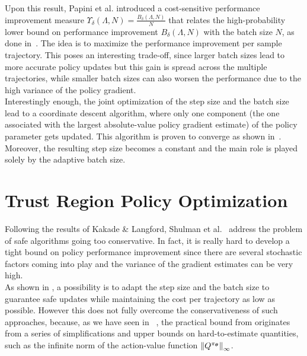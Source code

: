 Upon this result, Papini et al. introduced a cost-sensitive performance improvement measure $\Upsilon_\delta(\Lambda, N) = \frac{B_\delta(\Lambda, N)}{N}$ that relates the high-probability lower bound on performance improvement $B_\delta(\Lambda, N)$ with the batch size $N$, as done in~\cite{DBLP:journals/corr/abs-1712-03428}. The idea is to maximize the performance improvement per sample trajectory. This poses an interesting trade-off, since larger batch sizes lead to more accurate policy updates but this gain is spread across the multiple trajectories, while smaller batch sizes can also worsen the performance due to the high variance of the policy gradient.\\
Interestingly enough, the joint optimization of the step size and the batch size lead to a coordinate descent algorithm, where only one component (the one associated with the largest absolute-value policy gradient estimate) of the policy parameter gets updated. This algorithm is proven to converge as shown in~\cite{nutinicoordinate}. Moreover, the resulting step size becomes a constant and the main role is played solely by the adaptive batch size.

\section{Trust Region Policy Optimization}
\label{sec:trpo}
Following the results of Kakade \& Langford, Shulman et al.~\cite{trpo} address the problem of safe algorithms going too conservative. In fact, it is really hard to develop a tight bound on policy performance improvement since there are several stochastic factors coming into play and the variance of the gradient estimates can be very high.\\
As shown in , a possibility is to adapt the step size and the batch size to guarantee safe updates while maintaining the cost per trajectory as low as possible. However this does not fully overcome the conservativeness of such approaches, because, as we have seen in ~, the practical bound from  originates from a series of simplifications and upper bounds on hard-to-estimate quantities, such as the infinite norm of the action-value function $\norm[\infty]{Q^{\pi_{\vtheta}}}$.

